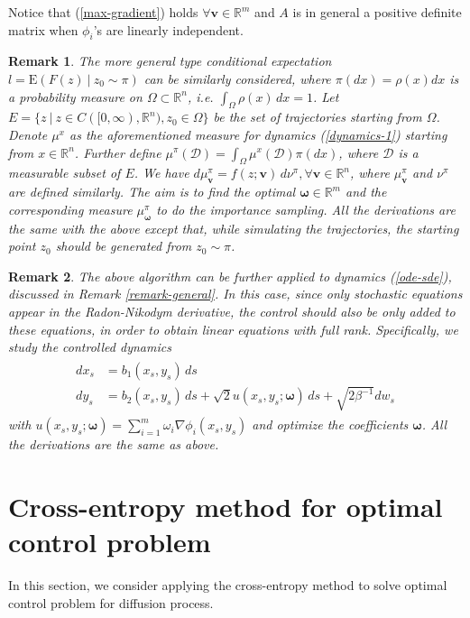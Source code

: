 \documentclass[final]{siamltex}
\newtheorem{remark}{Remark}
\begin{document}
Notice that (\ref{max-gradient}) holds $\forall \bm{v} \in \mathbb{R}^m$ and
$A$ is in general a positive definite matrix when $\phi_i$'s are linearly independent.
\begin{remark}
  The more general type conditional expectation 
  $l = \mathrm{E}(F(z)~|~ z_0 \sim \pi)$
  can be similarly considered,
where $\pi(dx) = \rho(x)dx$ is a probability measure on $\Omega
\subset \mathbb{R}^n$, i.e. $\int_\Omega \rho(x)\,dx = 1$. Let $E = \{z ~|~ z \in
  C([0,\infty), \mathbb{R}^n), z_0 \in \Omega\}$ be the set of trajectories
  starting from $\Omega$. Denote $\mu^x$ as the aforementioned measure for
  dynamics (\ref{dynamics-1}) starting from $x \in \mathbb{R}^n$. Further
  define $\mu^\pi(\mathcal{D}) = \int_{\Omega} \mu^x(\mathcal{D}) \pi(dx)$,
  where $\mathcal{D}$ is a measurable subset of $E$.
  We have $d\mu^\pi_{\bm{v}} = f(z;\bm{v})\,d\nu^\pi, \forall
  \bm{v} \in \mathbb{R}^n$, where $\mu^\pi_{\bm{v}}$ and $\nu^{\pi}$ are
  defined similarly. The aim is to find the optimal $\bm{\omega} \in
  \mathbb{R}^m$ and the corresponding measure $\mu^\pi_{\bm{\omega}}$ to do
  the importance sampling. All the derivations are the same with the above
  except that, while simulating the trajectories, 
  the starting point $z_0$ should be generated from $z_0 \sim \pi$.
\end{remark}
\begin{remark}
   The above algorithm can be further applied to dynamics (\ref{ode-sde}), discussed
   in Remark \ref{remark-general}. In this case, since only stochastic
   equations appear in the Radon-Nikodym derivative, the control should
   also be only added to these equations, in order to obtain linear equations
   with full rank. Specifically, we study the controlled dynamics 
         \begin{align}
      \begin{split}
	dx_s & = b_1(x_s, y_s)\, ds \\
	dy_s & = b_2(x_s, y_s)\, ds + \sqrt{2} u(x_s, y_s ; \bm{\omega})\, ds + \sqrt{2\beta^{-1}} dw_s
      \end{split}
      \label{ode-sde-control}
      \end{align}
      with $u(x_s, y_s ; \bm{\omega}) = \sum\limits_{i=1}^{m} \omega_i \nabla \phi_i(x_s,
      y_s)$ and optimize the coefficients $\bm{\omega}$. All the derivations are
      the same as above.
\end{remark}
\section{Cross-entropy method for optimal control problem}
\label{sec-ocp}
In this section, we consider applying the cross-entropy method to solve optimal control problem
for diffusion process.
\end{document}
